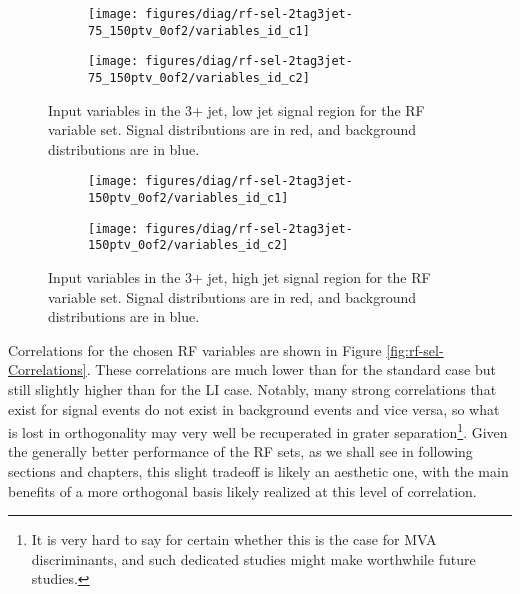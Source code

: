 \begin{figure}[!htbp]\captionsetup{justification=centering}
  \centering
\begin{subfigure}[t]{0.49\textwidth}\centering\texttt{[image: figures/diag/rf-sel-2tag3jet-75\_150ptv\_0of2/variables\_id\_c1]}\end{subfigure}
\begin{subfigure}[t]{0.49\textwidth}\centering\texttt{[image: figures/diag/rf-sel-2tag3jet-75\_150ptv\_0of2/variables\_id\_c2]}\end{subfigure}
  \caption{Input variables in the 3+ jet, low jet signal region for the RF variable set.  Signal distributions are in red, and background distributions are in blue.}
  \label{fig:rf-sel3jet-75_150ptv-inputs}
\end{figure}

\begin{figure}[!htbp]\captionsetup{justification=centering}
  \centering
\begin{subfigure}[t]{0.49\textwidth}\centering\texttt{[image: figures/diag/rf-sel-2tag3jet-150ptv\_0of2/variables\_id\_c1]}\end{subfigure}
\begin{subfigure}[t]{0.49\textwidth}\centering\texttt{[image: figures/diag/rf-sel-2tag3jet-150ptv\_0of2/variables\_id\_c2]}\end{subfigure}
  \caption{Input variables in the 3+ jet, high jet signal region for the RF variable set.  Signal distributions are in red, and background distributions are in blue.}
  \label{fig:rf-sel3jet-150ptv-inputs}
\end{figure}

Correlations for the chosen RF variables are shown in Figure \ref{fig:rf-sel-Correlations}.  These correlations are much lower than for the standard case but still slightly higher than for the LI case.  Notably, many strong correlations that exist for signal events do not exist in background events and vice versa, so what is lost in orthogonality may very well be recuperated in grater separation\footnote{It is very hard to say for certain whether this is the case for MVA discriminants, and such dedicated studies might make worthwhile future studies.}.  Given the generally better performance of the RF sets, as we shall see in following sections and chapters, this slight tradeoff is likely an aesthetic one, with the main benefits of a more orthogonal basis likely realized at this level of correlation.

